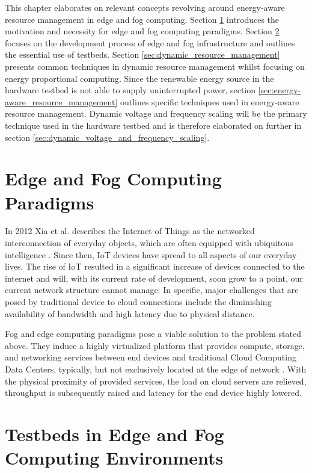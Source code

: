 This chapter elaborates on relevant concepts revolving around energy-aware
resource management in edge and fog computing. Section
\ref{sec:edge_and_fog_computing_paradigms} introduces the motivation and
necessity for edge and fog computing paradigms. Section
\ref{sec:testbeds_in_edge_and_fog_computing_environments} focuses on the
development process of edge and fog infrastructure and outlines the essential
use of testbeds. Section \ref{sec:dynamic_resource_management} presents common
techniques in dynamic resource management whilst focusing on energy proportional
computing. Since the renewable energy source in the hardware testbed is not able
to supply uninterrupted power, section
\ref{sec:energy-aware_resource_management} outlines specific techniques used in
energy-aware resource management. Dynamic voltage and frequency scaling will be
the primary technique used in the hardware testbed and is therefore elaborated
on further in section \ref{sec:dynamic_voltage_and_frequency_scaling}.

\section{Edge and Fog Computing Paradigms}
\label{sec:edge_and_fog_computing_paradigms}

In 2012 Xia et al. describes the Internet of Things as the networked
interconnection of everyday objects, which are often equipped with ubiquitous
intelligence \cite{xia2012}. Since then, IoT devices have spread to all aspects
of our everyday lives. The rise of IoT resulted in a significant increase of
devices connected to the internet and will, with its current rate of
development, soon grow to a point, our current network structure cannot manage.
In specific, major challenges that are posed by traditional device to cloud
connections include the diminishing availability of bandwidth and high latency
due to physical distance.

Fog and edge computing paradigms pose a viable solution to the problem stated
above. They induce a highly virtualized platform that provides compute, storage,
and networking services between end devices and traditional Cloud Computing Data
Centers, typically, but not exclusively located at the edge of network
\cite{bonomi2012}. With the physical proximity of provided services, the load on
cloud servers are relieved, throughput is subsequently raised and latency for
the end device highly lowered.

\section{Testbeds in Edge and Fog Computing Environments}
\label{sec:testbeds_in_edge_and_fog_computing_environments}

